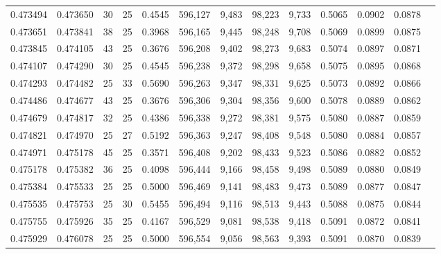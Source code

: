 \begin{tabular}{rrrrrrrrrrrrr}
0.473494 & 0.473650 &    30 &  25 &                                     0.4545 & 596,127 &   9,483 &  98,223 &   9,733 & 0.5065 & 0.0902 & 0.0878 \\
0.473651 & 0.473841 &    38 &  25 &                                     0.3968 & 596,165 &   9,445 &  98,248 &   9,708 & 0.5069 & 0.0899 & 0.0875 \\
0.473845 & 0.474105 &    43 &  25 &                                     0.3676 & 596,208 &   9,402 &  98,273 &   9,683 & 0.5074 & 0.0897 & 0.0871 \\
0.474107 & 0.474290 &    30 &  25 &                                     0.4545 & 596,238 &   9,372 &  98,298 &   9,658 & 0.5075 & 0.0895 & 0.0868 \\
0.474293 & 0.474482 &    25 &  33 &                                     0.5690 & 596,263 &   9,347 &  98,331 &   9,625 & 0.5073 & 0.0892 & 0.0866 \\
0.474486 & 0.474677 &    43 &  25 &                                     0.3676 & 596,306 &   9,304 &  98,356 &   9,600 & 0.5078 & 0.0889 & 0.0862 \\
0.474679 & 0.474817 &    32 &  25 &                                     0.4386 & 596,338 &   9,272 &  98,381 &   9,575 & 0.5080 & 0.0887 & 0.0859 \\
0.474821 & 0.474970 &    25 &  27 &                                     0.5192 & 596,363 &   9,247 &  98,408 &   9,548 & 0.5080 & 0.0884 & 0.0857 \\
0.474971 & 0.475178 &    45 &  25 &                                     0.3571 & 596,408 &   9,202 &  98,433 &   9,523 & 0.5086 & 0.0882 & 0.0852 \\
0.475178 & 0.475382 &    36 &  25 &                                     0.4098 & 596,444 &   9,166 &  98,458 &   9,498 & 0.5089 & 0.0880 & 0.0849 \\
0.475384 & 0.475533 &    25 &  25 &                                     0.5000 & 596,469 &   9,141 &  98,483 &   9,473 & 0.5089 & 0.0877 & 0.0847 \\
0.475535 & 0.475753 &    25 &  30 &                                     0.5455 & 596,494 &   9,116 &  98,513 &   9,443 & 0.5088 & 0.0875 & 0.0844 \\
0.475755 & 0.475926 &    35 &  25 &                                     0.4167 & 596,529 &   9,081 &  98,538 &   9,418 & 0.5091 & 0.0872 & 0.0841 \\
0.475929 & 0.476078 &    25 &  25 &                                     0.5000 & 596,554 &   9,056 &  98,563 &   9,393 & 0.5091 & 0.0870 & 0.0839 \\

\end{tabular}

